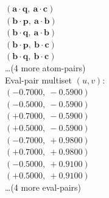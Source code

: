 \documentclass[a4paper,11pt]{article}
\newcommand{\pdcegfomjfhook}[2]{\mathbf{#1} \cdot \mathbf{#2}}
\begin{document}
$(\pdcegfomjfhook{a}{q},\ \pdcegfomjfhook{a}{c})$\\
$(\pdcegfomjfhook{b}{p},\ \pdcegfomjfhook{a}{b})$\\
$(\pdcegfomjfhook{b}{q},\ \pdcegfomjfhook{a}{b})$\\
$(\pdcegfomjfhook{b}{p},\ \pdcegfomjfhook{b}{c})$\\
$(\pdcegfomjfhook{b}{q},\ \pdcegfomjfhook{b}{c})$\\
\quad \ldots (4 more atom-pairs)\\
\quad Eval-pair multiset $(u, v)$:\\
$(-0.7000,\ -0.5900)$\\
$(-0.5000,\ -0.5900)$\\
$(+0.7000,\ -0.5900)$\\
$(+0.5000,\ -0.5900)$\\
$(-0.7000,\ +0.9800)$\\
$(+0.7000,\ +0.9800)$\\
$(-0.5000,\ +0.9100)$\\
$(+0.5000,\ +0.9100)$\\
\quad \ldots (4 more eval-pairs)\\
\end{document}
